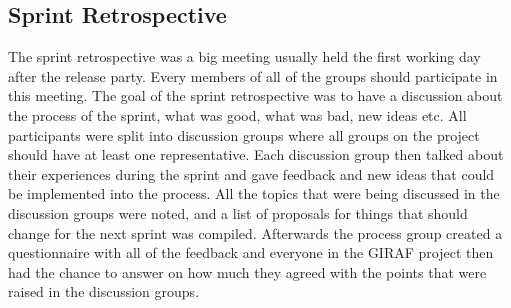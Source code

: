 \subsection{Sprint Retrospective}
The sprint retrospective was a big meeting usually held the first working day after the release party.
Every members of all of the groups should participate in this meeting.
The goal of the sprint retrospective was to have a discussion about the process of the sprint, what was good, what was bad, new ideas etc.
All participants were split into discussion groups where all groups on the project should have at least one representative.
\newline
\newline
Each discussion group then talked about their experiences during the sprint and gave feedback and new ideas that could be implemented into the process.
All the topics that were being discussed in the discussion groups were noted, and a list of proposals for things that should change for the next sprint was compiled.
Afterwards the process group created a questionnaire with all of the feedback and everyone in the GIRAF project then had the chance to answer on how much they agreed with the points that were raised in the discussion groups.

